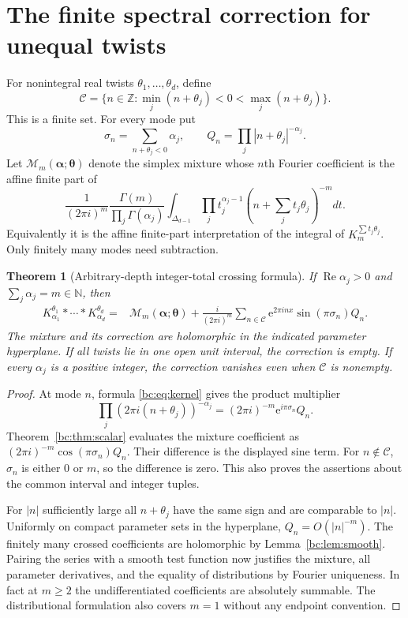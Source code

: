 \documentclass[11pt,letterpaper]{article}
\numberwithin{equation}{section}
\newtheorem{theorem}{Theorem}[section]
\theoremstyle{definition}
\theoremstyle{remark}
\newcommand{\bcRe}{\operatorname{Re}}
\newcommand{\bcC}{\mathcal C}
\newcommand{\bcN}{\mathbb N}
\newcommand{\bce}{\mathrm e}
\begin{document}
\section{The finite spectral correction for unequal twists}
\label{bc:sec:periodic}

For nonintegral real twists $\theta_1,\ldots,\theta_d$, define
\begin{equation}\label{bc:eq:crossed-modes}
 \bcC=\{n\in\mathbb Z:\min_j(n+\theta_j)<0<\max_j(n+\theta_j)\}.
\end{equation}
This is a finite set. For every mode put
\[
 \sigma_n=\sum_{n+\theta_j<0}\alpha_j,
 \qquad Q_n=\prod_j|n+\theta_j|^{-\alpha_j}.
\]
Let $\mathcal M_m(\bm\alpha;\bm\theta)$ denote the simplex mixture whose
$n$th Fourier coefficient is the affine finite part of
\[
 \frac1{(2\pi i)^m}
 \frac{\Gamma(m)}{\prod_j\Gamma(\alpha_j)}
 \int_{\Delta_{d-1}}\prod_jt_j^{\alpha_j-1}
                     \left(n+\sum_jt_j\theta_j\right)^{-m}dt.
\]
Equivalently it is the affine finite-part interpretation of the integral
of $K_m^{\sum t_j\theta_j}$. Only finitely many modes need subtraction.

\begin{theorem}[Arbitrary-depth integer-total crossing formula]
\label{bc:thm:periodic}
If $\bcRe\alpha_j>0$ and $\sum_j\alpha_j=m\in\bcN$, then
\begin{align}
 K_{\alpha_1}^{\theta_1}*\cdots*K_{\alpha_d}^{\theta_d}
 ={}&\mathcal M_m(\bm\alpha;\bm\theta)
 +\frac{i}{(2\pi i)^m}\sum_{n\in\bcC}
      \bce^{2\pi i n x}\sin(\pi\sigma_n)Q_n.
 \label{bc:eq:periodic-main}
\end{align}
The mixture and its correction are holomorphic in the indicated
parameter hyperplane. If all twists lie in one open unit interval, the
correction is empty. If every $\alpha_j$ is a positive integer, the
correction vanishes even when $\bcC$ is nonempty.
\end{theorem}
\begin{proof}
At mode $n$, formula \eqref{bc:eq:kernel} gives the product multiplier
\begin{equation}\label{bc:eq:mode-phase}
 \prod_j(2\pi i(n+\theta_j))^{-\alpha_j}
       =(2\pi i)^{-m}\bce^{i\pi\sigma_n}Q_n.
\end{equation}
Theorem~\ref{bc:thm:scalar} evaluates the mixture coefficient as
$(2\pi i)^{-m}\cos(\pi\sigma_n)Q_n$. Their difference is the displayed
sine term. For $n\notin\bcC$, $\sigma_n$ is either $0$ or $m$, so the
difference is zero. This also proves the assertions about the common
interval and integer tuples.

For $|n|$ sufficiently large all $n+\theta_j$ have the same sign and are
comparable to $|n|$. Uniformly on compact parameter sets in the
hyperplane, $Q_n=O(|n|^{-m})$. The finitely many crossed coefficients
are holomorphic by Lemma~\ref{bc:lem:smooth}. Pairing the series with a
smooth test function now justifies the mixture, all parameter
derivatives, and the equality of distributions by Fourier uniqueness.
In fact at $m\ge2$ the undifferentiated coefficients are absolutely
summable. The distributional formulation also covers $m=1$ without any
endpoint convention.
\end{proof}
\end{document}
